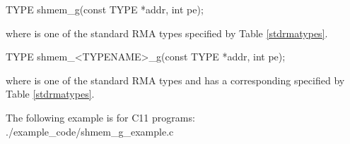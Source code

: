 
\begin{apidefinition}

\begin{C11synopsis}
TYPE shmem_g(const TYPE *addr, int pe);
\end{C11synopsis}
where \TYPE{} is one of the standard \ac{RMA} types specified by Table \ref{stdrmatypes}.

\begin{Csynopsis}
TYPE shmem_<TYPENAME>_g(const TYPE *addr, int pe);
\end{Csynopsis}
where \TYPE{} is one of the standard \ac{RMA} types and has a corresponding \TYPENAME{} specified by Table \ref{stdrmatypes}.

\begin{apiarguments}
\end{apiarguments}




\begin{apiexamples}

\apicexample
    {The following  example is for C11 programs:}
    {./example_code/shmem_g_example.c}
    {}
\end{apiexamples}

\end{apidefinition}
